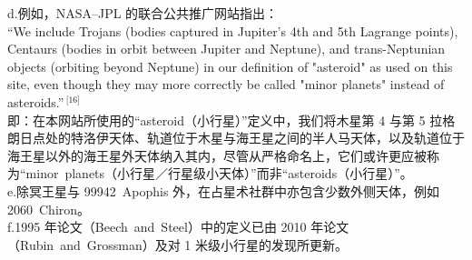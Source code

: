 d.例如，NASA–JPL 的联合公共推广网站指出：\\
``We include Trojans (bodies captured in Jupiter's 4th and 5th Lagrange points), Centaurs (bodies in orbit between Jupiter and Neptune), and trans-Neptunian objects (orbiting beyond Neptune) in our definition of "asteroid" as used on this site, even though they may more correctly be called "minor planets" instead of asteroids.''\,\(^\text{[16]}\)\\
即：在本网站所使用的“asteroid（小行星）”定义中，我们将木星第 4 与第 5 拉格朗日点处的特洛伊天体、轨道位于木星与海王星之间的半人马天体，以及轨道位于海王星以外的海王星外天体纳入其内，尽管从严格命名上，它们或许更应被称为“minor~planets（小行星／行星级小天体）”而非“asteroids（小行星）”。\\
e.除冥王星与 99942~Apophis 外，在占星术社群中亦包含少数外侧天体，例如 2060~Chiron。\\
f.1995 年论文（Beech~and~Steel）中的定义已由 2010 年论文（Rubin~and~Grossman）及对 1 米级小行星的发现所更新。
